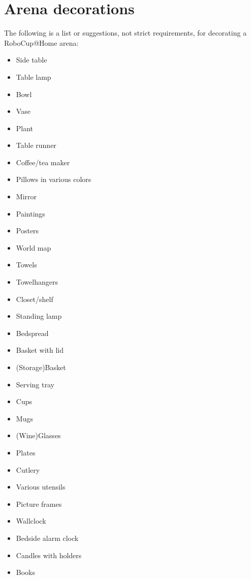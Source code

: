 \chapter{Arena decorations}\label{chap:arena-decorations-appendix}
The following is a list or suggestions, not strict requirements, for decorating a RoboCup@Home arena:
\begin{itemize}
  \item Side table
  \item Table lamp
  \item Bowl
  \item Vase
  \item Plant
  \item Table runner
  \item Coffee/tea maker
  \item Pillows in various colors
  \item Mirror
  \item Paintings
  \item Posters
  \item World map
  \item Towels
  \item Towelhangers
  \item Closet/shelf
  \item Standing lamp
  \item Bedspread
  \item Basket with lid
  \item (Storage)Basket
  \item Serving tray
  \item Cups
  \item Mugs
  \item (Wine)Glasses
  \item Plates
  \item Cutlery
  \item Various utensils
  \item Picture frames
  \item Wallclock
  \item Bedside alarm clock
  \item Candles with holders
  \item Books
\end{itemize}
